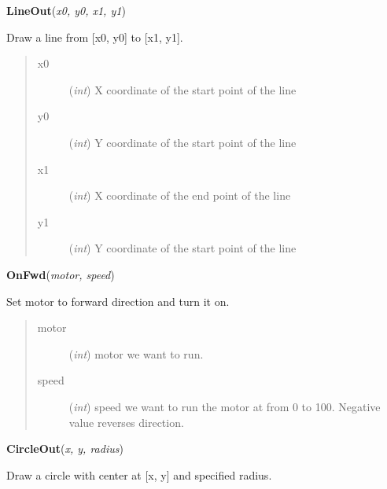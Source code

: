 \documentclass[10pt,a4paper]{article}
\begin{document}
 

\vspace{6pt}
{\bf LineOut}({\it x0, y0, x1, y1}) 
    
    Draw a line from [x0, y0] to [x1, y1].





    

\begin{quote}
    \begin{description}
        
\item[x0] ({\emph{int}}) X coordinate of the start point of the line

\item[y0] ({\emph{int}}) Y coordinate of the start point of the line

\item[x1] ({\emph{int}}) X coordinate of the end point of the line

\item[y1] ({\emph{int}}) Y coordinate of the start point of the line

    \end{description}
\end{quote}

 

\vspace{6pt}
{\bf OnFwd}({\it motor, speed}) 
  
    Set motor to forward direction and turn it on.
    


    

\begin{quote}
    \begin{description}
        
\item[motor] ({\emph{int}}) motor we want to run.

\item[speed] ({\emph{int}}) speed we want to run the motor at from 0 to 100. Negative value reverses direction.   

    \end{description}
\end{quote}

 

\vspace{6pt}
{\bf CircleOut}({\it x, y, radius}) 

    Draw a circle with center at [x, y] and specified radius.
\end{document}
